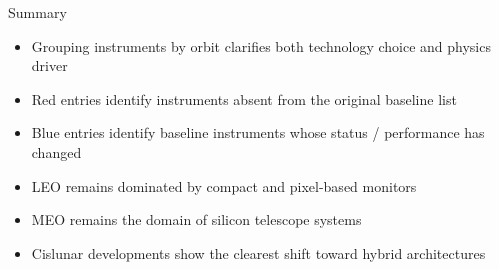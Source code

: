 \documentclass[aspectratio=169]{beamer}
\begin{document}
\begin{frame}{Summary}
\begin{itemize}
\item Grouping instruments by orbit clarifies both technology choice and physics driver
\item \textcolor{newinst}{Red entries} identify instruments absent from the original baseline list
\item \textcolor{updatedinst}{Blue entries} identify baseline instruments whose status / performance has changed
\item LEO remains dominated by compact and pixel-based monitors
\item MEO remains the domain of silicon telescope systems
\item Cislunar developments show the clearest shift toward hybrid architectures
\end{itemize}
\end{frame}
\end{document}
